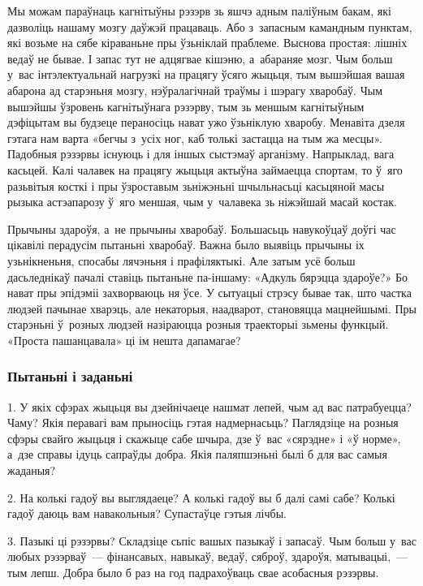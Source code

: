 Мы можам параўнаць кагнітыўны рэзэрв зь яшчэ адным паліўным бакам, які дазволіць нашаму мозгу даўжэй працаваць. Або з~запасным камандным пунктам, які возьме на сябе кіраваньне пры ўзьніклай праблеме. Выснова простая: лішніх ведаў не бывае. І запас тут не адцягвае кішэню, а~абараняе мозг. Чым больш у~вас інтэлектуальнай нагрузкі на працягу ўсяго жыцьця, тым вышэйшая вашая абарона ад старэньня мозгу, нэўралагічнай траўмы і шэрагу хваробаў. Чым вышэйшы ўзровень кагнітыўнага рэзэрву, тым зь меншым кагнітыўным дэфіцытам вы будзеце пераносіць нават ужо ўзьніклую хваробу. Менавіта дзеля гэтага нам варта «бегчы з~усіх ног, каб толькі застацца на тым жа месцы». Падобныя рэзэрвы існуюць і для іншых сыстэмаў арганізму. Напрыклад, вага касьцей. Калі чалавек на працягу жыцьця актыўна займаецца спортам, то ў~яго разьвітыя косткі і пры ўзроставым зьніжэньні шчыльнасьці касьцяной масы рызыка астэапарозу ў~яго меншая, чым у~чалавека зь ніжэйшай масай костак.

Прычыны здароўя, а~не прычыны хваробаў. Большасьць навукоўцаў доўгі час цікавілі перадусім пытаньні хваробаў. Важна было выявіць прычыны іх узьнікненьня, спосабы лячэньня і прафіляктыкі. Але затым усё больш дасьледнікаў пачалі ставіць пытаньне па-іншаму: «Адкуль бярэцца здароўе?» Бо нават пры эпідэміі захворваюць ня ўсе. У сытуацыі стрэсу бывае так, што частка людзей пачынае хварэць, але некаторыя, наадварот, становяцца мацнейшымі. Пры старэньні ў~розных людзей назіраюцца розныя траекторыі зьмены функцый. «Проста пашанцавала» ці ім нешта дапамагае?

\subsubsection{Пытаньні і заданьні}

1. У якіх сфэрах жыцьця вы дзейнічаеце нашмат лепей, чым ад вас патрабуецца? Чаму? Якія перавагі вам прыносіць гэтая надмернасьць? Паглядзіце на розныя сфэры свайго жыцьця і скажыце сабе шчыра, дзе ў~вас «сярэдне» і «ў норме», а~дзе справы ідуць сапраўды добра. Якія паляпшэньні былі б для вас самыя жаданыя?

2. На колькі гадоў вы выглядаеце? А колькі гадоў вы б далі самі сабе? Колькі гадоў даюць вам навакольныя? Супастаўце гэтыя лічбы.

3. Пазыкі ці рэзэрвы? Складзіце сьпіс вашых пазыкаў і запасаў. Чым больш у~вас любых рэзэрваў~--- фінансавых, навыкаў, ведаў, сяброў, здароўя, матывацыі,~--- тым лепш. Добра было б раз на год падрахоўваць свае асобасныя рэзэрвы.


